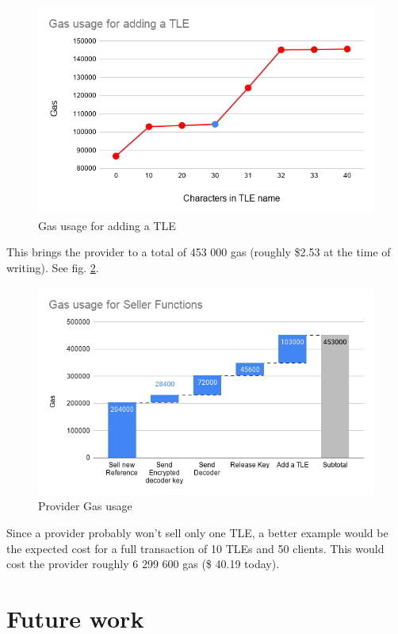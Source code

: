\documentclass[conference]{IEEEtran}
\begin{document}
    
\begin{figure}[!htb]
\includegraphics[width=\linewidth]{Gas usage for adding a TLE.png}
 \caption{Gas usage for adding a TLE}
 \label{fig:TLE-Gas-Usage}
\end{figure}

This brings the provider to a total of 453 000 gas (roughly \$2.53 at the time of writing). See fig. \ref{fig:Provider-Gas-Usage}.

\begin{figure}[!htb]
\includegraphics[width=\linewidth]{Gas usage for Seller Functions.png}
 \caption{Provider Gas usage}
 \label{fig:Provider-Gas-Usage}
\end{figure}

Since a provider probably won't sell only one TLE, a better example would be the expected cost for a full transaction of 10 TLEs and 50 clients. This would cost the provider roughly 6 299 600 gas  (\$ 40.19 today).

\section{Future work}{\label{Future work section}}
\end{document}
